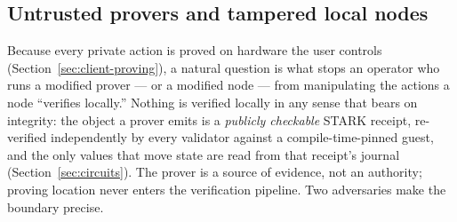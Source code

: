 \documentclass[11pt]{article}
\theoremstyle{plain}
\theoremstyle{definition}
\theoremstyle{remark}
\begin{document}
\subsection{Untrusted provers and tampered local nodes}
\label{sec:local-proving-integrity}

Because every private action is proved on hardware the user controls
(Section~\ref{sec:client-proving}), a natural question is what stops an
operator who runs a modified prover --- or a modified node --- from
manipulating the actions a node ``verifies locally.'' Nothing is verified
locally in any sense that bears on integrity: the object a prover emits is a
\emph{publicly checkable} STARK receipt, re-verified independently by every
validator against a compile-time-pinned guest, and the only values that move
state are read from that receipt's journal (Section~\ref{sec:circuits}). The
prover is a source of evidence, not an authority; proving location never
enters the verification pipeline. Two adversaries make the boundary precise.
\end{document}
